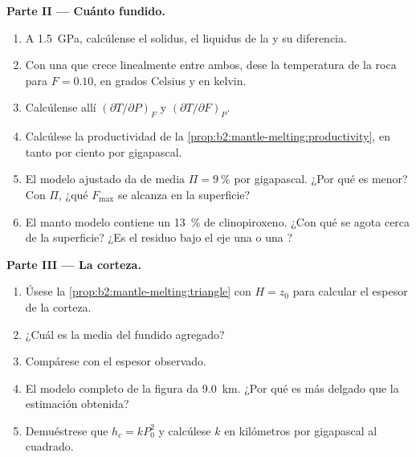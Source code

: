 \begin{problem}
\noindent\textbf{Parte II --- Cuánto fundido.}
\begin{enumerate}[resume]
\item A \qty{1.5}{GPa}, calcúlense el solidus, el liquidus de la  y su
diferencia.
\item Con una  que crece linealmente entre ambos, dese la temperatura de
la roca para $F = 0.10$, en grados Celsius y en kelvin.
\item Calcúlense allí $(\partial T/\partial P)_F$ y $(\partial T/\partial F)_P$.
\item Calcúlese la productividad de la \cref{prop:b2:mantle-melting:productivity}, en
tanto por ciento por gigapascal.
\item El modelo ajustado da de media $\Pi = \qty{9}{\percent}$ por gigapascal.
¿Por qué es menor? Con $\Pi$, ¿qué  $F_{\max}$ se alcanza en la
superficie?
\item El manto modelo contiene un \qty{13}{\percent} de clinopiroxeno. ¿Con qué  se agota cerca de la superficie? ¿Es el residuo bajo el eje una
 o una ?
\end{enumerate}

\noindent\textbf{Parte III --- La corteza.}
\begin{enumerate}[resume]
\item Úsese la \cref{prop:b2:mantle-melting:triangle} con $H = z_0$ para calcular el
espesor de la corteza.
\item ¿Cuál es la  media del fundido agregado?
\item Compárese con el espesor observado.
\item El modelo completo de la figura da \qty{9.0}{km}. ¿Por qué es más delgado que
la estimación obtenida?
\item Demuéstrese que $h_c = k P_0^2$ y calcúlese $k$ en kilómetros por gigapascal
al cuadrado.
\end{enumerate}


\end{problem}
